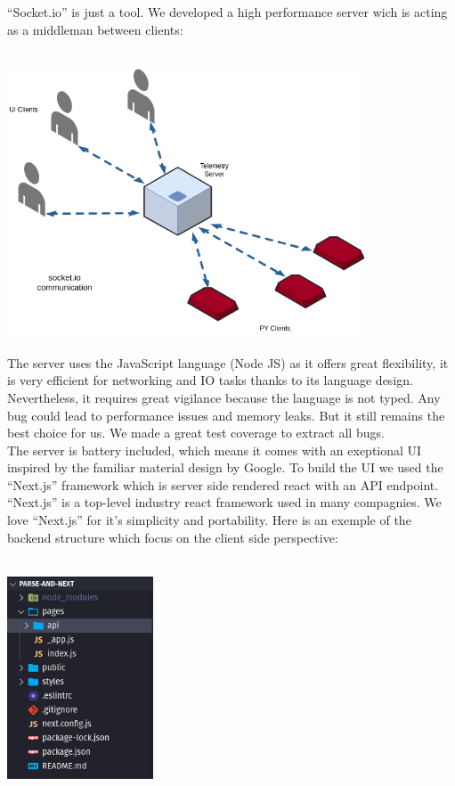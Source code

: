 \documentclass[12pt]{article}
\begin{document}
“Socket.io” is just a tool. We developed a high performance server wich is acting as a middleman between clients: \\ \\
\centerline{\includegraphics[height=8cm]{../../docs/diagram.png}}

The server uses the JavaScript language (Node JS) as it offers great flexibility, it is very efficient for networking and IO tasks thanks to its language design. Nevertheless, it requires great vigilance because the language is not typed. Any bug could lead to performance issues and memory leaks. But it still remains the best choice for us. We made a great test coverage to extract all bugs. \\


The server is battery included, which means it comes with an exeptional UI inspired by the familiar material design by Google. To build the UI we used the “Next.js” framework which is server side rendered react with an API endpoint. “Next.js” is a top-level industry react framework used in many compagnies. We love “Next.js” for it’s simplicity and portability. Here is an exemple of the backend structure which focus on the client side perspective: \\ \\
\centerline{\includegraphics[height=6cm]{../../docs/server-struct.png}}
\end{document}
